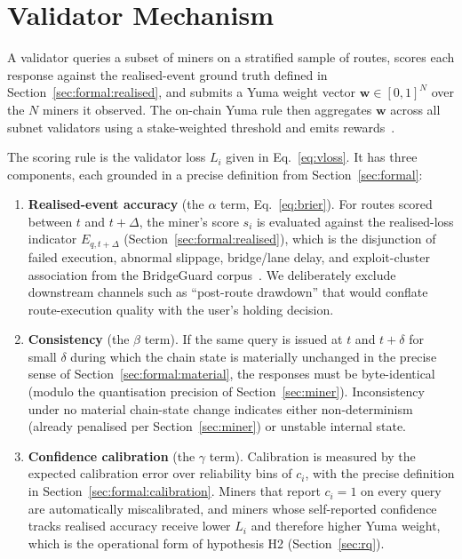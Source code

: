 \documentclass[11pt,a4paper]{article}
\begin{document}
\section{Validator Mechanism}\label{sec:validator}

A validator queries a subset of miners on a stratified sample of routes, scores each
response against the realised-event ground truth defined in
Section~\ref{sec:formal:realised}, and submits a Yuma weight vector
$\mathbf{w} \in [0,1]^{N}$ over the $N$ miners it observed. The on-chain Yuma rule then
aggregates $\mathbf{w}$ across all subnet validators using a stake-weighted threshold and
emits rewards~\cite{opentensor2024yuma}.

The scoring rule is the validator loss $L_i$ given in Eq.~\eqref{eq:vloss}. It has three
components, each grounded in a precise definition from Section~\ref{sec:formal}:
\begin{enumerate}
  \item \textbf{Realised-event accuracy} (the $\alpha$ term, Eq.~\eqref{eq:brier}).
        For routes scored between $t$ and $t + \Delta$, the miner's score $s_i$ is
        evaluated against the realised-loss indicator $E_{q, t+\Delta}$
        (Section~\ref{sec:formal:realised}), which is the disjunction of failed
        execution, abnormal slippage, bridge/lane delay, and exploit-cluster association
        from the BridgeGuard corpus~\cite{wu2025safeguarding}. We deliberately exclude
        downstream channels such as ``post-route drawdown'' that would conflate
        route-execution quality with the user's holding decision.
  \item \textbf{Consistency} (the $\beta$ term). If the same query is issued at $t$ and
        $t + \delta$ for small $\delta$ during which the chain state is materially
        unchanged in the precise sense of Section~\ref{sec:formal:material}, the
        responses must be byte-identical (modulo the quantisation precision of
        Section~\ref{sec:miner}). Inconsistency under no material chain-state change
        indicates either non-determinism (already penalised per Section~\ref{sec:miner})
        or unstable internal state.
  \item \textbf{Confidence calibration} (the $\gamma$ term). Calibration is measured by
        the expected calibration error over reliability bins of $c_i$, with the precise
        definition in Section~\ref{sec:formal:calibration}. Miners that report $c_i = 1$
        on every query are automatically miscalibrated, and miners whose self-reported
        confidence tracks realised accuracy receive lower $L_i$ and therefore higher
        Yuma weight, which is the operational form of hypothesis H2
        (Section~\ref{sec:rq}).
\end{enumerate}
\end{document}

